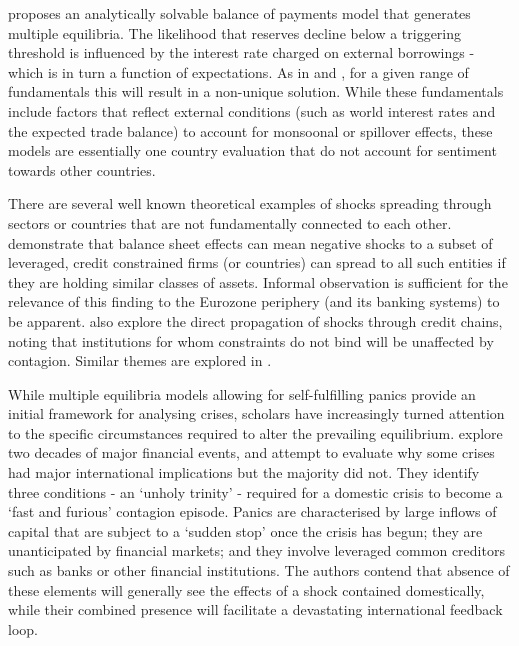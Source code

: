 \documentclass[../base.tex]{subfiles}
\begin{document}
\cite{masson1999contagion} proposes an analytically solvable balance of payments model that generates multiple equilibria. The likelihood that reserves decline below a triggering threshold is influenced by the interest rate charged on external borrowings - which is in turn a function of expectations. As in \cite{obstfeld1996models} and \cite{jeanne1997currency}, for a given range of fundamentals this will result in a non-unique solution. While these fundamentals include factors that reflect external conditions (such as world interest rates and the expected trade balance) to account for monsoonal or spillover effects, these models are essentially one country evaluation that do not account for sentiment towards other countries. 

There are several well known theoretical examples of shocks spreading through sectors or countries that are not fundamentally connected to each other. \cite{kiyotaki2002balance} demonstrate that balance sheet effects can mean negative shocks to a subset of leveraged, credit constrained firms (or countries) can spread to all such entities if they are holding similar classes of assets. Informal observation is sufficient for the relevance of this finding to the Eurozone periphery (and its banking systems) to be apparent. \cite{kiyotaki1997credit} also explore the direct propagation of shocks through credit chains, noting that institutions for whom constraints do not bind will be unaffected by contagion. Similar themes are explored in \cite{rochet1996interbank}.

While multiple equilibria models allowing for self-fulfilling panics provide an initial framework for analysing crises, scholars have increasingly turned attention to the specific circumstances required to alter the prevailing equilibrium. \cite{kaminsky2003unholy} explore two decades of major financial events, and attempt to evaluate why some crises had major international implications but the majority did not. They identify three conditions - an `unholy trinity' - required for a domestic crisis to become a `fast and furious' contagion episode. Panics are characterised by large inflows of capital that are subject to a `sudden stop' once the crisis has begun; they are unanticipated by financial markets; and they involve leveraged common creditors such as banks or other financial institutions. The authors contend that absence of these elements will generally see the effects of a shock contained domestically, while their combined presence will facilitate a devastating international feedback loop. 
\end{document}
